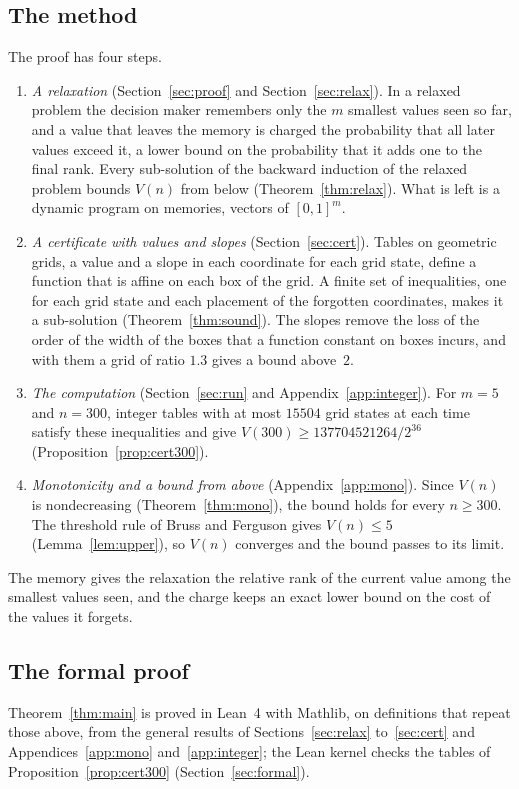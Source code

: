 \documentclass[11pt]{amsart}
\theoremstyle{definition}
\numberwithin{equation}{section}
\begin{document}
\subsection*{The method}
The proof has four steps.
\begin{enumerate}[label=(\arabic*)]
\item\emph{A relaxation} (Section~\ref{sec:proof} and Section~\ref{sec:relax}). In a relaxed problem the decision maker remembers only the $m$ smallest values seen so far, and a value that leaves the memory is charged the probability that all later values exceed it, a lower bound on the probability that it adds one to the final rank. Every sub-solution of the backward induction of the relaxed problem bounds $V(n)$ from below (Theorem~\ref{thm:relax}). What is left is a dynamic program on memories, vectors of $[0,1]^m$.
\item\emph{A certificate with values and slopes} (Section~\ref{sec:cert}). Tables on geometric grids, a value and a slope in each coordinate for each grid state, define a function that is affine on each box of the grid. A finite set of inequalities, one for each grid state and each placement of the forgotten coordinates, makes it a sub-solution (Theorem~\ref{thm:sound}). The slopes remove the loss of the order of the width of the boxes that a function constant on boxes incurs, and with them a grid of ratio $1.3$ gives a bound above~$2$.
\item\emph{The computation} (Section~\ref{sec:run} and Appendix~\ref{app:integer}). For $m=5$ and $n=300$, integer tables with at most $15504$ grid states at each time satisfy these inequalities and give $V(300)\ge137704521264/2^{36}$ (Proposition~\ref{prop:cert300}).
\item\emph{Monotonicity and a bound from above} (Appendix~\ref{app:mono}). Since $V(n)$ is nondecreasing (Theorem~\ref{thm:mono}), the bound holds for every $n\ge300$. The threshold rule of Bruss and Ferguson gives $V(n)\le5$ (Lemma~\ref{lem:upper}), so $V(n)$ converges and the bound passes to its limit.
\end{enumerate}
The memory gives the relaxation the relative rank of the current value among the smallest values seen, and the charge keeps an exact lower bound on the cost of the values it forgets.

\subsection*{The formal proof}
Theorem~\ref{thm:main} is proved in Lean~4 with Mathlib, on definitions that repeat those above, from the general results of Sections~\ref{sec:relax} to~\ref{sec:cert} and Appendices~\ref{app:mono} and~\ref{app:integer}; the Lean kernel checks the tables of Proposition~\ref{prop:cert300} (Section~\ref{sec:formal}).
\end{document}
